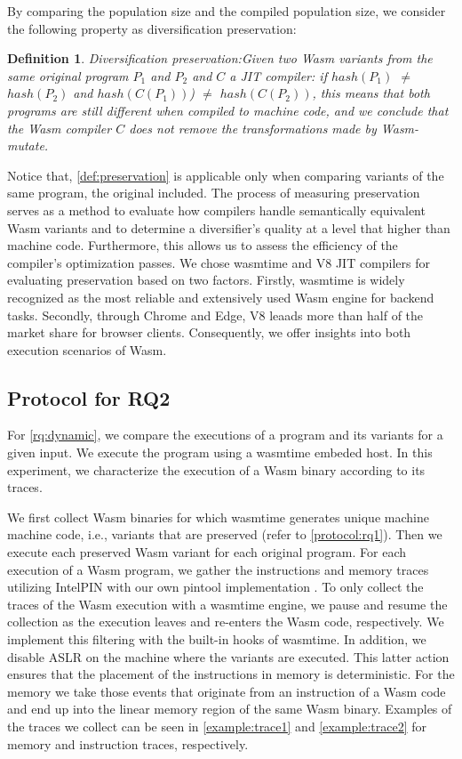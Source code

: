 \documentclass[sigplan,screen]{acmart}
\newcommand{\tool}{Wasm-mutate\xspace}
\newcommand{\wasm}{Wasm\xspace}
\newtheorem{definition}{Definition}
\begin{document}
By comparing the population size and the compiled population size, we consider the following property as diversification preservation: \\
\begin{definition}{Diversification preservation:}\label{def:preservation}
    Given two \wasm variants from the same original program $P_1$ and $P_2$ and $C$ a JIT compiler:
    if $hash(P_1)$ $\neq$ $hash(P_2)$ and $hash(C(P_1))$) $\neq$ $hash(C(P_2))$, this means that  both programs are still different when compiled to machine code, and we conclude that the \wasm compiler $C$ does not remove the transformations made by \tool.  
    
\end{definition}

Notice that, \autoref{def:preservation} is applicable only when comparing variants of the same program, the original included. 
The process of measuring preservation serves as a method to evaluate how compilers handle semantically equivalent \wasm variants and to determine a diversifier's quality at a level that higher than machine code. 
Furthermore, this allows us to assess the efficiency of the compiler's optimization passes. 
We chose wasmtime and V8 JIT compilers for evaluating preservation based on two factors. 
Firstly, wasmtime is widely recognized as the most reliable and extensively used \wasm engine for backend tasks. 
Secondly, through Chrome and Edge, V8 leaads more than half of the market share for browser clients. 
Consequently, we offer insights into both execution scenarios of \wasm.




\subsection{Protocol for RQ2}

For \ref{rq:dynamic}, we compare  the executions of a program and its variants for a given input. 
We execute the program using a wasmtime embeded host.
In this experiment, we characterize the  execution of a \wasm binary according to its traces.

We first collect \wasm binaries for which wasmtime generates unique machine machine code, i.e., variants that are preserved (refer to \autoref{protocol:rq1}).
Then we execute each preserved \wasm variant for each original program.
For each execution of a \wasm program, we gather the instructions and memory traces utilizing IntelPIN with our own pintool implementation \cite{luk2005pin, 10.1145/3478520}.
To only collect the traces of the Wasm execution with a wasmtime engine, we pause and resume the collection as the execution leaves and re-enters the Wasm code, respectively.
We implement this filtering with the built-in hooks of wasmtime.
In addition, we disable ASLR on the machine where the variants are executed.
This latter action ensures that the placement of the instructions in memory is deterministic.
For the memory we take those events that originate from an instruction of a Wasm code and end up into the linear memory region of the same Wasm binary.
Examples of the traces we collect can be seen in \autoref{example:trace1} and \autoref{example:trace2} for memory and instruction traces, respectively.
\end{document}
